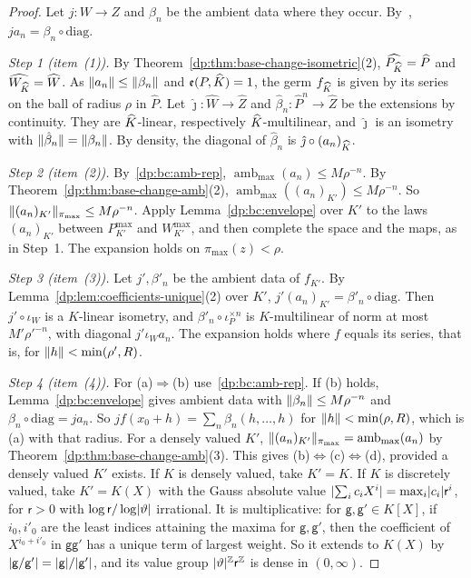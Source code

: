 \begin{proof}
Let $j\colon W\to Z$ and $\beta_n$ be the ambient data where they occur. By~\cite[Proposition~14.9]{I}, $ja_n=\beta_n\circ\mathrm{diag}$.

\emph{Step 1 (item~(1)).} By Theorem~\ref{dp:thm:base-change-isometric}(2), $\widehat{P_{\widehat K}}=\widehat P$ and $\widehat{W_{\widehat K}}=\widehat W$. As $\lVert a_n\rVert\le\lVert \beta_n\rVert$ and $\mathfrak e(P,\widehat K)=1$, the germ $f_{\widehat K}$ is given by its series on the ball of radius $\rho$ in $\widehat P$. Let $\hat\jmath\colon\widehat W\to\widehat Z$ and $\hat\beta_n\colon\widehat P^n\to\widehat Z$ be the extensions by continuity. They are $\widehat K$-linear, respectively $\widehat K$-multilinear, and $\hat\jmath$ is an isometry with $\lVert \hat\beta_n\rVert=\lVert \beta_n\rVert$. By density, the diagonal of $\hat\beta_n$ is $\hat\jmath\circ(a_n)_{\widehat K}$.

\emph{Step 2 (item~(2)).} By~\eqref{dp:bc:amb-rep}, $\operatorname{amb}_{\max}(a_n)\le M\rho^{-n}$. By Theorem~\ref{dp:thm:base-change-amb}(2), $\operatorname{amb}_{\max}((a_n)_{K'})\le M\rho^{-n}$. So $\lVert (a_n)_{K'}\rVert_{\pi_{\max}}\le M\rho^{-n}$. Apply Lemma~\ref{dp:bc:envelope} over $K'$ to the laws $(a_n)_{K'}$ between $P^{\max}_{K'}$ and $W^{\max}_{K'}$, and then complete the space and the maps, as in Step~1. The expansion holds on $\pi_{\max}(z)<\rho$.

\emph{Step 3 (item~(3)).} Let $j',\beta'_n$ be the ambient data of $f_{K'}$. By Lemma~\ref{dp:lem:coefficients-unique}(2) over $K'$, $j'(a_n)_{K'}=\beta'_n\circ\mathrm{diag}$. Then $j'\circ\iota_W$ is a $K$-linear isometry, and $\beta'_n\circ\iota_P^{\times n}$ is $K$-multilinear of norm at most $M'\rho'^{-n}$, with diagonal $j'\iota_Wa_n$. The expansion holds where $f$ equals its series, that is, for $\lVert h\rVert<\min(\rho',R)$.

\emph{Step 4 (item~(4)).} For (a)$\Rightarrow$(b) use~\eqref{dp:bc:amb-rep}. If (b) holds, Lemma~\ref{dp:bc:envelope} gives ambient data with $\lVert \beta_n\rVert\le M\rho^{-n}$ and $\beta_n\circ\mathrm{diag}=ja_n$. So $jf(x_0+h)=\sum_n\beta_n(h,\dots,h)$ for $\lVert h\rVert<\min(\rho,R)$, which is (a) with that radius. For a densely valued $K'$, $\lVert (a_n)_{K'}\rVert_{\pi_{\max}}=\operatorname{amb}_{\max}(a_n)$ by Theorem~\ref{dp:thm:base-change-amb}(3). This gives (b)$\Leftrightarrow$(c)$\Leftrightarrow$(d), provided a densely valued $K'$ exists. If $K$ is densely valued, take $K'=K$. If $K$ is discretely valued, take $K'=K(X)$ with the Gauss absolute value $\lvert \sum_ic_iX^i\rvert=\max_i\lvert c_i\rvert\mathsf r^i$, for $\mathsf r>0$ with $\log\mathsf r/\log\lvert \vartheta\rvert$ irrational. It is multiplicative: for $\mathsf g,\mathsf g'\in K[X]$, if $i_0,i'_0$ are the least indices attaining the maxima for $\mathsf g,\mathsf g'$, then the coefficient of $X^{i_0+i'_0}$ in $\mathsf g\mathsf g'$ has a unique term of largest weight. So it extends to $K(X)$ by $\lvert \mathsf g/\mathsf g'\rvert=\lvert \mathsf g\rvert/\lvert \mathsf g'\rvert$, and its value group $\lvert \vartheta\rvert^{\mathbb Z}\mathsf r^{\mathbb Z}$ is dense in $(0,\infty)$.


\end{proof}
